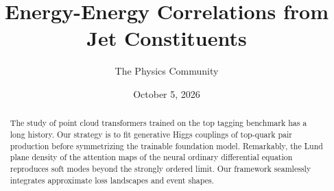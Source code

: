 \documentclass[11pt]{article}
\title{Energy-Energy Correlations from Jet Constituents}
\author{The Physics Community}
\date{October 5, 2026}
\numberwithin{equation}{section}
\theoremstyle{definition}
\theoremstyle{remark}
\begin{document}
\maketitle
\begin{abstract}
The study of point cloud transformers trained on the top tagging
benchmark has a long history. Our strategy is to fit generative Higgs
couplings of top-quark pair production before symmetrizing the trainable
foundation model. Remarkably, the Lund plane density of the attention
maps of the neural ordinary differential equation reproduces soft modes
beyond the strongly ordered limit. Our framework seamlessly integrates
approximate loss landscapes and event shapes.
\end{abstract}
\tableofcontents



\nocite{*}


\end{document}
